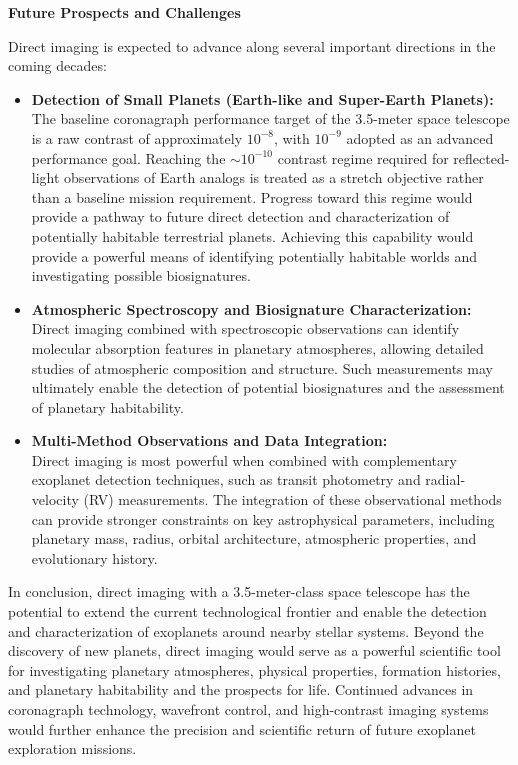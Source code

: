 \vspace{\baselineskip}
\textbf{Future Prospects and Challenges}

Direct imaging is expected to advance along several important directions in the coming decades:

\begin{itemize}
\item
  \textbf{Detection of Small Planets (Earth-like and Super-Earth Planets):}\\
  The baseline coronagraph performance target of the 3.5-meter space telescope is a raw contrast of approximately \(10^{-8}\), with \(10^{-9}\) adopted as an advanced performance goal. Reaching the \(\sim10^{-10}\) contrast regime required for reflected-light observations of Earth analogs is treated as a stretch objective rather than a baseline mission requirement. Progress toward this regime would provide a pathway to future direct detection and characterization of potentially habitable terrestrial planets.  
  Achieving this capability would provide a powerful means of identifying potentially habitable worlds and investigating possible biosignatures.
\item
  \textbf{Atmospheric Spectroscopy and Biosignature Characterization:}\\
  Direct imaging combined with spectroscopic observations can identify molecular absorption features in planetary atmospheres, allowing detailed studies of atmospheric composition and structure. Such measurements may ultimately enable the detection of potential biosignatures and the assessment of planetary habitability.
\item
  \textbf{Multi-Method Observations and Data Integration:}\\
  Direct imaging is most powerful when combined with complementary exoplanet detection techniques, such as transit photometry and radial-velocity (RV) measurements. The integration of these observational methods can provide stronger constraints on key astrophysical parameters, including planetary mass, radius, orbital architecture, atmospheric properties, and evolutionary history.
\end{itemize}

In conclusion, direct imaging with a 3.5-meter-class space telescope has the potential to extend the current technological frontier and enable the detection and characterization of exoplanets around nearby stellar systems. Beyond the discovery of new planets, direct imaging would serve as a powerful scientific tool for investigating planetary atmospheres, physical properties, formation histories, and planetary habitability and the prospects for life. Continued advances in coronagraph technology, wavefront control, and high-contrast imaging systems would further enhance the precision and scientific return of future exoplanet exploration missions.

